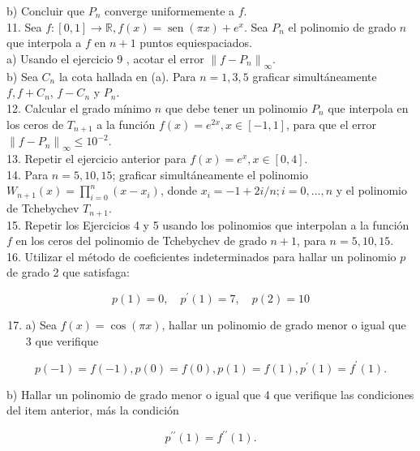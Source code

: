 \documentclass[10pt]{article}
\begin{document}
b) Concluir que $P_{n}$ converge uniformemente a $f$.\\
11. Sea $f:[0,1] \rightarrow \mathbb{R}, f(x)=\operatorname{sen}(\pi x)+e^{x}$. Sea $P_{n}$ el polinomio de grado $n$ que interpola a $f$ en $n+1$ puntos equiespaciados.\\
a) Usando el ejercicio 9 , acotar el error $\left\|f-P_{n}\right\|_{\infty}$.\\
b) Sea $C_{n}$ la cota hallada en (a). Para $n=1,3,5$ graficar simultáneamente $f, f+C_{n}$, $f-C_{n}$ y $P_{n}$.\\
12. Calcular el grado mínimo $n$ que debe tener un polinomio $P_{n}$ que interpola en los ceros de $T_{n+1}$ a la función $f(x)=e^{2 x}, x \in[-1,1]$, para que el error $\left\|f-P_{n}\right\|_{\infty} \leq 10^{-2}$.\\
13. Repetir el ejercicio anterior para $f(x)=e^{x}, x \in[0,4]$.\\
14. Para $n=5,10,15$; graficar simultáneamente el polinomio $W_{n+1}(x)=\prod_{i=0}^{n}\left(x-x_{i}\right)$, donde $x_{i}=-1+2 i / n ; i=0, \ldots, n$ y el polinomio de Tchebychev $T_{n+1}$.\\
15. Repetir los Ejercicios 4 y 5 usando los polinomios que interpolan a la función $f$ en los ceros del polinomio de Tchebychev de grado $n+1$, para $n=5,10,15$.\\
16. Utilizar el método de coeficientes indeterminados para hallar un polinomio $p$ de grado 2 que satisfaga:

$$
p(1)=0, \quad p^{\prime}(1)=7, \quad p(2)=10
$$

\begin{enumerate}
  \setcounter{enumi}{16}
  \item a) Sea $f(x)=\cos (\pi x)$, hallar un polinomio de grado menor o igual que 3 que verifique
\end{enumerate}

$$
p(-1)=f(-1), p(0)=f(0), p(1)=f(1), p^{\prime}(1)=f^{\prime}(1) .
$$

b) Hallar un polinomio de grado menor o igual que 4 que verifique las condiciones del item anterior, más la condición

$$
p^{\prime \prime}(1)=f^{\prime \prime}(1) .
$$
\end{document}
